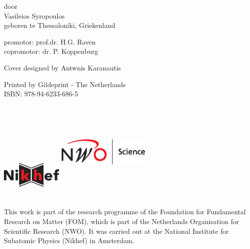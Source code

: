 \begin{titlepage}
\begin{center}
door\\
\vspace{0.5cm}
Vasileios Syropoulos\\
\vspace{0.5cm}
geboren te Thessaloniki, Griekenland

\end{center}

\clearpage

\begin{flushleft}
promotor: prof.dr. H.G. Raven\\
copromotor: dr. P. Koppenburg
\end{flushleft}

\vfill


\clearpage

\begin{center}
	Cover designed by Antwnis Karanautis\\

	\vspace{1cm}

	\vspace{0.1cm}
	Printed by Gildeprint - The Netherlands\\
	ISBN: 978-94-6233-686-5

	\vspace{9cm}

	\includegraphics[width=3cm,height=2.5cm,keepaspectratio]{Figures/nikhef-logo.eps}
	\hspace{2cm}
	\includegraphics[width=4.5cm,height=5cm,keepaspectratio]{Figures/nwo-logo.eps}
\end{center}

	\noindent This work is part of the research programme of the Foundation for Fundamental
	Research on Matter (FOM), which is part of the Netherlands Organisation for
	Scientific Research (NWO). It was carried out at the National Institute for
	Subatomic Physics (Nikhef) in Amsterdam.


\end{titlepage}
